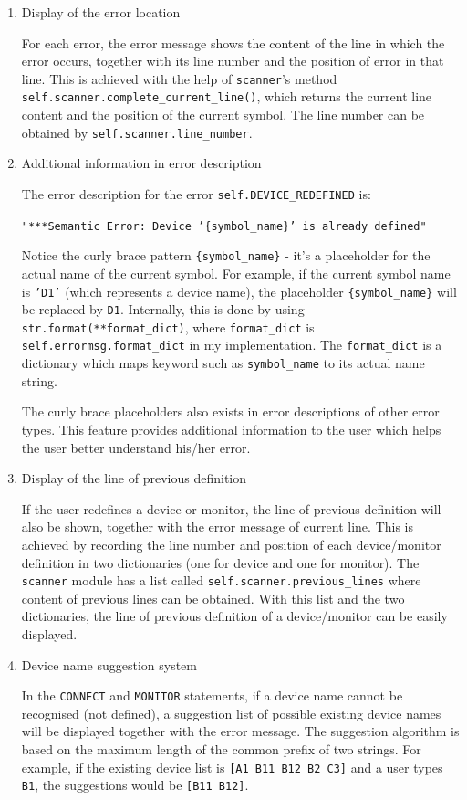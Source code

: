 \documentclass[10pt,a4paper]{article}
\begin{document}
\begin{enumerate}
\item Display of the error location
\label{sec:org6e3d71d}

For each error, the error message shows the content of the line in
which the error occurs, together with its line number and the position
of error in that line. This is achieved with the help of \texttt{scanner}'s
method \texttt{self.scanner.complete\_current\_line()}, which returns the
current line content and the position of the current symbol. The line
number can be obtained by \texttt{self.scanner.line\_number}. 

\item Additional information in error description
\label{sec:org38081ff}

The error description for the error \texttt{self.DEVICE\_REDEFINED} is:

\texttt{"***Semantic Error: Device '\{symbol\_name\}' is already defined"}

Notice the curly brace pattern \texttt{\{symbol\_name\}} - it's a placeholder
for the actual name of the current symbol. For example, if the current
symbol name is \texttt{'D1'} (which represents a device name), the
placeholder \texttt{\{symbol\_name\}} will be replaced by \texttt{D1}. Internally, this
is done by using \texttt{str.format(**format\_dict)}, where \texttt{format\_dict} is
\texttt{self.errormsg.format\_dict} in my implementation. The \texttt{format\_dict} is
a dictionary which maps keyword such as \texttt{symbol\_name} to its actual
name string. 

The curly brace placeholders also exists in error descriptions of
other error types. This feature provides additional information to the
user which helps the user better understand his/her error.

\item Display of the line of previous definition
\label{sec:org24a5586}

If the user redefines a device or monitor, the line of previous
definition will also be shown, together with the error message of
current line. This is achieved by recording the line number and
position of each device/monitor definition in two dictionaries (one
for device and one for monitor). The \texttt{scanner} module has a list
called \texttt{self.scanner.previous\_lines} where content of previous lines
can be obtained. With this list and the two dictionaries, the line of
previous definition of a device/monitor can be easily displayed.

\item Device name suggestion system
\label{sec:org29b2a6f}

In the \texttt{CONNECT} and \texttt{MONITOR} statements, if a device name cannot be
recognised (not defined), a suggestion list of possible existing
device names will be displayed together with the error message. The
suggestion algorithm is based on the maximum length of the common
prefix of two strings. For example, if the existing device list is
\texttt{[A1 B11 B12 B2 C3]} and a user types \texttt{B1}, the suggestions would be
\texttt{[B11 B12]}.
\end{enumerate}
\end{document}
